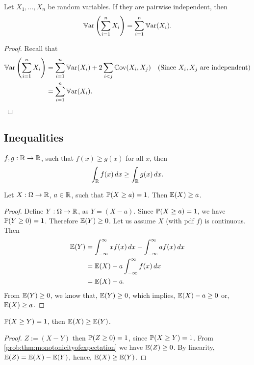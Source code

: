 \documentclass[10pt, a4paper]{article}
\begin{document}
\begin{corollary}
    Let $X_1, \dotsc, X_n$ be random variables.
    If they are pairwise independent,
    then
    \[
    \Var\left(\sum_{i = 1}^{n}X_i\right) = \sum_{i = 1}^{n}\Var(X_i).
    \]
    \begin{proof}
        Recall that
        \begin{align*}
            \Var\left(\sum_{i = 1}^{n}X_i\right) &= \sum_{i = 1}^{n}\Var(X_i) + 2\sum_{i < j}\Cov(X_i, X_j) & \text{(Since $X_i, X_j$ are independent)} \\
            &= \sum_{i = 1}^{n}\Var(X_i).
        \end{align*}
    \end{proof}
\end{corollary}

\subsection{Inequalities}
$f, g : \R \rightarrow \R$,
such that
$f(x) \geq g(x)$ for all $x$,
then
\[
\int_{\R}f(x)\,dx \geq \int_{\R}g(x)\,dx.
\]
\begin{theorem}\label{prob:thm:monotonicityofexpectation}
    Let $X : \Omega \rightarrow \R$,
    $a \in \R$,
    such that $\P(X \geq a) = 1$.
    Then $\E(X) \geq a$.
    \begin{proof}
        Define $Y : \Omega \rightarrow \R$,
        as $Y = (X - a).$
        Since $\P(X \geq a) = 1$,
        we have $\P(Y \geq 0) = 1$.
        Therefore $\E(Y) \geq 0$.
        Let us assume $X$
        (with pdf $f$)
        is continuous.
        Then
        \begin{align*}
            \E(Y) &= \int_{-\infty}^{\infty}xf(x)\,dx - \int_{-\infty}^{\infty}af(x)\,dx \\
            &= \E(X) - a\int_{-\infty}^{\infty}f(x)\,dx \\
            &= \E(X) - a.
        \end{align*}
        From $\E(Y) \geq 0$,
        we know that,
        $\E(Y) \geq 0$,
        which implies,
        $\E(X) - a \geq 0$ or,
        $\E(X) \geq a$.
    \end{proof}
\end{theorem}

\begin{example}
    $\P(X \geq Y) = 1$,
    then $\E(X) \geq \E(Y)$.
    \begin{proof}
        $Z := (X - Y)$ then $\P(Z \geq 0) = 1$,
        since $\P(X \geq Y) = 1$.
        From \autoref{prob:thm:monotonicityofexpectation} we have $\E(Z) \geq 0$.
        By linearity,
        $\E(Z) = \E(X) - \E(Y)$,
        hence,
        $\E(X) \geq \E(Y)$.
    \end{proof}
\end{example}
\end{document}
